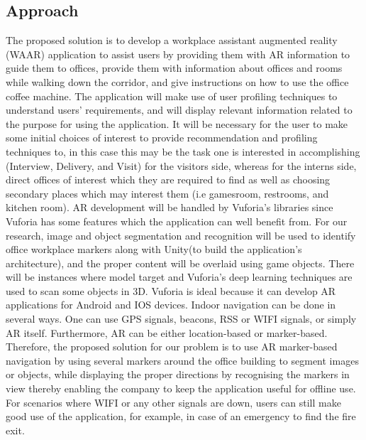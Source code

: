 \documentclass{aifyp}
\begin{document}
\subsection{Approach}
\indent The proposed solution is to develop a workplace assistant augmented reality (WAAR) application to assist users by providing them with AR information to guide them to offices, provide them with information about offices and rooms while walking down the corridor, and give instructions on how to use the office coffee machine. The application will make use of user profiling techniques to understand users’ requirements, and will display relevant information related to the purpose for using the application. It will be necessary for the user to make some initial choices of interest to provide recommendation and profiling techniques to, in this case this may be the task one is interested in accomplishing (Interview, Delivery, and Visit) for the visitors side, whereas for the interns side, direct offices of interest which they are required to find as well as choosing secondary places which may interest them (i.e gamesroom, restrooms, and kitchen room). 
\newline
\newline
\indent AR development will be handled by Vuforia’s libraries since Vuforia has some features which the application can well benefit from. For our research, image and object segmentation and recognition will be used to identify office workplace markers along with Unity(to build the application's architecture), and the proper content will be overlaid using game objects. There will be instances where model target and Vuforia’s deep learning techniques are used to scan some objects in 3D. Vuforia is ideal because it can develop AR applications for Android and IOS devices.
\newline
\newline
\indent Indoor navigation can be done in several ways. One can use GPS signals, beacons, RSS or WIFI signals, or simply AR itself. Furthermore, AR can be either location-based or marker-based. Therefore, the proposed solution for our problem is to use AR marker-based navigation by using several markers around the office building to segment images or objects, while displaying the proper directions by recognising the markers in view thereby enabling the company to keep the application useful for offline use. For scenarios where WIFI or any other signals are down, users can still make good use of the application, for example, in case of an emergency to find the fire exit. 
\end{document}
